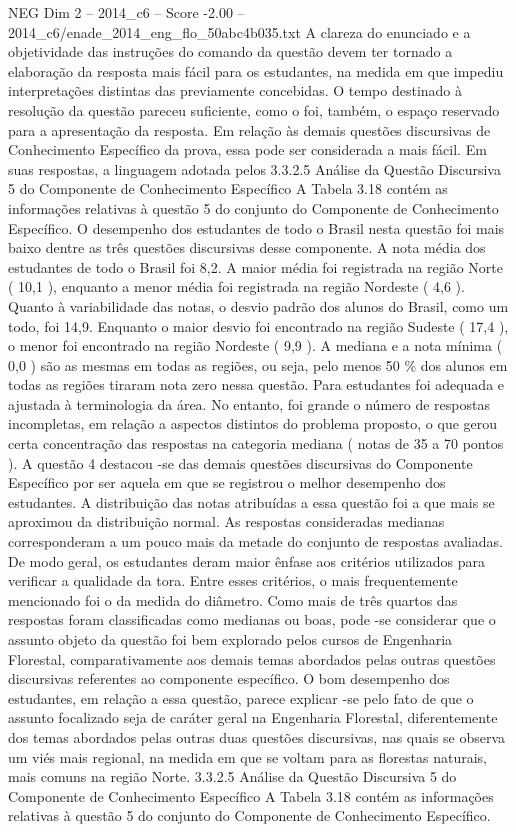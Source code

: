 \begin{textsample}{NEG Dim 2 – 2014\_c6 – Score -2.00 – 2014\_c6/enade\_2014\_eng\_flo\_50abc4b035.txt}
A clareza do enunciado e a objetividade das instruções do comando da questão devem ter tornado a elaboração da resposta mais fácil para os estudantes, na medida em que impediu interpretações distintas das previamente concebidas.
O tempo destinado à resolução da questão pareceu suficiente, como o foi, também, o espaço reservado para a apresentação da resposta.
Em relação às demais questões discursivas de Conhecimento Específico da prova, essa pode ser considerada a mais fácil.
Em suas respostas, a linguagem adotada pelos 3.3.2.5 Análise da Questão Discursiva 5 do Componente de Conhecimento Específico A Tabela 3.18 contém as informações relativas à questão 5 do conjunto do Componente de Conhecimento Específico.
O desempenho dos estudantes de todo o Brasil nesta questão foi mais baixo dentre as três questões discursivas desse componente.
A nota média dos estudantes de todo o Brasil foi 8,2.
A maior média foi registrada na região Norte ( 10,1 ), enquanto a menor média foi registrada na região Nordeste ( 4,6 ).
Quanto à variabilidade das notas, o desvio padrão dos alunos do Brasil, como um todo, foi 14,9.
Enquanto o maior desvio foi encontrado na região Sudeste ( 17,4 ), o menor foi encontrado na região Nordeste ( 9,9 ).
A mediana e a nota mínima ( 0,0 ) são as mesmas em todas as regiões, ou seja, pelo menos 50 \% dos alunos em todas as regiões tiraram nota zero nessa questão.
Para estudantes foi adequada e ajustada à terminologia da área.
No entanto, foi grande o número de respostas incompletas, em relação a aspectos distintos do problema proposto, o que gerou certa concentração das respostas na categoria mediana ( notas de 35 a 70 pontos ).
A questão 4 destacou -se das demais questões discursivas do Componente Específico por ser aquela em que se registrou o melhor desempenho dos estudantes.
A distribuição das notas atribuídas a essa questão foi a que mais se aproximou da distribuição normal.
As respostas consideradas medianas corresponderam a um pouco mais da metade do conjunto de respostas avaliadas.
De modo geral, os estudantes deram maior ênfase aos critérios utilizados para verificar a qualidade da tora.
Entre esses critérios, o mais frequentemente mencionado foi o da medida do diâmetro.
Como mais de três quartos das respostas foram classificadas como medianas ou boas, pode -se considerar que o assunto objeto da questão foi bem explorado pelos cursos de Engenharia Florestal, comparativamente aos demais temas abordados pelas outras questões discursivas referentes ao componente específico.
O bom desempenho dos estudantes, em relação a essa questão, parece explicar -se pelo fato de que o assunto focalizado seja de caráter geral na Engenharia Florestal, diferentemente dos temas abordados pelas outras duas questões discursivas, nas quais se observa um viés mais regional, na medida em que se voltam para as florestas naturais, mais comuns na região Norte. 3.3.2.5 Análise da Questão Discursiva 5 do Componente de Conhecimento Específico A Tabela 3.18 contém as informações relativas à questão 5 do conjunto do Componente de Conhecimento Específico.

\end{textsample}
